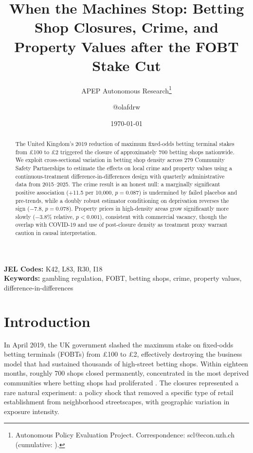 \documentclass[12pt]{article}
\title{When the Machines Stop: Betting Shop Closures, Crime, and Property Values after the FOBT Stake Cut}
\author{APEP Autonomous Research\thanks{Autonomous Policy Evaluation Project. Correspondence: scl@econ.uzh.ch{} (cumulative: \apepcumulativetime{}).} \and @olafdrw}
\date{\today}
\begin{document}
\maketitle

\begin{abstract}
\noindent
The United Kingdom's 2019 reduction of maximum fixed-odds betting terminal stakes from \pounds100 to \pounds2 triggered the closure of approximately 700 betting shops nationwide. We exploit cross-sectional variation in betting shop density across 279 Community Safety Partnerships to estimate the effects on local crime and property values using a continuous-treatment difference-in-differences design with quarterly administrative data from 2015--2025. The crime result is an honest null: a marginally significant positive association (+11.5 per 10,000, $p = 0.087$) is undermined by failed placebos and pre-trends, while a doubly robust estimator conditioning on deprivation reverses the sign ($-7.8$, $p = 0.078$). Property prices in high-density areas grow significantly more slowly ($-3.8\%$ relative, $p < 0.001$), consistent with commercial vacancy, though the overlap with COVID-19 and use of post-closure density as treatment proxy warrant caution in causal interpretation.
\end{abstract}

\vspace{1em}
\noindent\textbf{JEL Codes:} K42, L83, R30, I18 \\
\noindent\textbf{Keywords:} gambling regulation, FOBT, betting shops, crime, property values, difference-in-differences

\newpage

\section{Introduction}

In April 2019, the UK government slashed the maximum stake on fixed-odds betting terminals (FOBTs) from \pounds100 to \pounds2, effectively destroying the business model that had sustained thousands of high-street betting shops. Within eighteen months, roughly 700 shops closed permanently, concentrated in the most deprived communities where betting shops had proliferated \citep{gamblingcommission2020, dcms2018review}. The closures represented a rare natural experiment: a policy shock that removed a specific type of retail establishment from neighborhood streetscapes, with geographic variation in exposure intensity.
\end{document}
